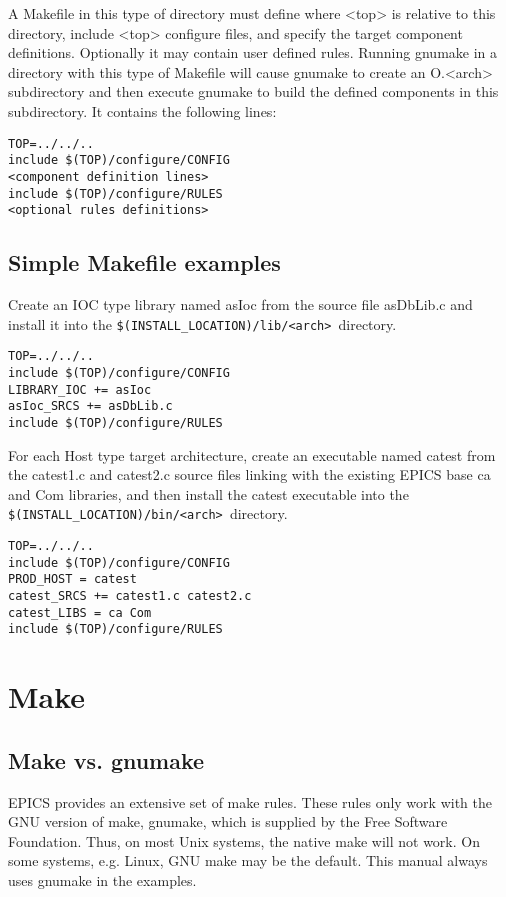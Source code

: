 A Makefile in this type of directory must define where \textless{}top\textgreater{} is relative to this directory, include \textless{}top\textgreater{} configure files, 
and specify the target component definitions. Optionally it may contain user defined rules. Running gnumake in a 
directory with this type of Makefile will cause gnumake to create an O.\textless{}arch\textgreater{} subdirectory and then execute gnumake to 
build the defined components in this subdirectory. It contains the following lines:

\begin{verbatim}TOP=../../..
include $(TOP)/configure/CONFIG
<component definition lines>
include $(TOP)/configure/RULES
<optional rules definitions>
\end{verbatim}\subsection{Simple Makefile examples}

Create an IOC type library named asIoc from the source file asDbLib.c and install it into the 
\verb|$(INSTALL_LOCATION)/lib/<arch> |directory.

\begin{verbatim}TOP=../../..
include $(TOP)/configure/CONFIG
LIBRARY_IOC += asIoc
asIoc_SRCS += asDbLib.c
include $(TOP)/configure/RULES
\end{verbatim}For each Host type target architecture, create an executable named catest from the catest1.c and catest2.c source files 
linking with the existing EPICS base ca and Com libraries, and then install the catest executable into the 
\verb|$(INSTALL_LOCATION)/bin/<arch> |directory.

\begin{verbatim}TOP=../../..
include $(TOP)/configure/CONFIG
PROD_HOST = catest
catest_SRCS += catest1.c catest2.c
catest_LIBS = ca Com
include $(TOP)/configure/RULES
\end{verbatim}\section{Make}

\subsection{Make vs. gnumake}

EPICS provides an extensive set of make rules. These rules only work with the GNU version of make, gnumake, which is 
supplied by the Free Software Foundation. Thus, on most Unix systems, the native make will not work. On some systems, 
e.g. Linux, GNU make may be the default. This manual always uses gnumake in the examples. 

